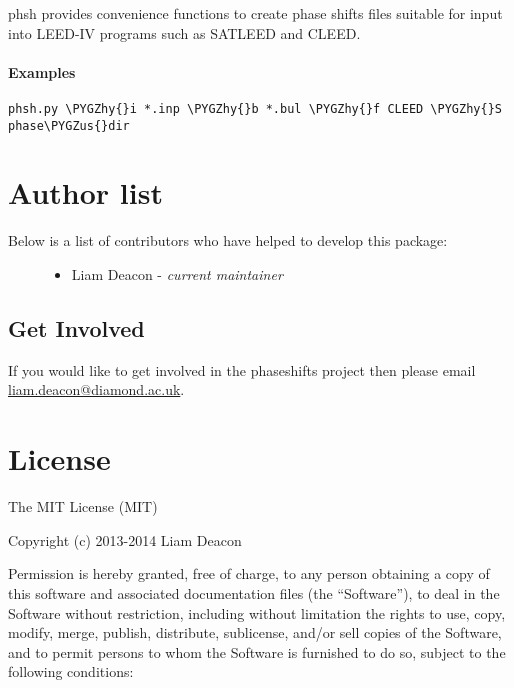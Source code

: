 \documentclass[letterpaper,10pt,english]{sphinxmanual}
\def\PYGZus{\char`\_}
\def\PYGZhy{\char`\-}
\begin{document}
phsh provides convenience functions to create phase shifts files
suitable for input into LEED-IV programs such as SATLEED and CLEED.


\subsubsection{Examples}
\label{modules:id2}
\begin{Verbatim}[commandchars=\\\{\}]
phsh.py \PYGZhy{}i *.inp \PYGZhy{}b *.bul \PYGZhy{}f CLEED \PYGZhy{}S phase\PYGZus{}dir
\end{Verbatim}


\chapter{Author list}
\label{authors:author-list}\label{authors::doc}\label{authors:authors}\begin{description}
\item[{Below is a list of contributors who have helped to develop this package:}] \leavevmode\begin{itemize}
\item {} 
Liam Deacon - \emph{current maintainer}

\end{itemize}

\end{description}


\section{Get Involved}
\label{authors:get-involved}
If you would like to get involved in the phaseshifts project then
please email \href{mailto:liam.deacon@diamond.ac.uk}{liam.deacon@diamond.ac.uk}.


\chapter{License}
\label{LICENSE::doc}\label{LICENSE:license}\label{LICENSE:id1}
The MIT License (MIT)

Copyright (c) 2013-2014 Liam Deacon

Permission is hereby granted, free of charge, to any person obtaining a copy
of this software and associated documentation files (the ``Software''), to deal
in the Software without restriction, including without limitation the rights
to use, copy, modify, merge, publish, distribute, sublicense, and/or sell
copies of the Software, and to permit persons to whom the Software is
furnished to do so, subject to the following conditions:
\end{document}
